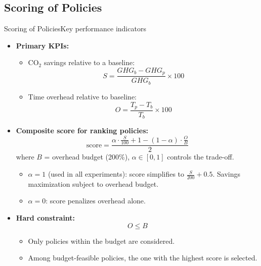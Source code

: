 \subsection{Scoring of Policies}

\begin{frame}[t]{Scoring of Policies}{Key performance indicators}

  \begin{itemize}
    \item \textbf{Primary KPIs:}
      \begin{itemize}
        \item CO$_2$ savings relative to a baseline:
          \[
            S
            = \frac{GHG_{b} -
            GHG_{p}}{GHG_{b}} \times 100
          \]
        \item Time overhead relative to baseline:
          \[
            O
            = \frac{T_{p} -
            T_{b}}{T_{b}} \times 100
          \]
      \end{itemize}

      \vspace{0.2cm}
      \item \textbf{Composite score for ranking policies:}
      \[
        \text{score} = \frac{
          \alpha \cdot \frac{S}{100}
          + 1 - (1-\alpha) \cdot \frac{O}{B}
        }{2}
      \]
      where $B$ = overhead budget (200\%), $\alpha \in [0,1]$ controls
      the trade-off.
      \begin{itemize}
        \item $\alpha = 1$ (used in all experiments): score simplifies to
          $\frac{S}{200} + 0.5$.
          Savings maximization subject to overhead budget.
        \item $\alpha = 0$: score penalizes overhead alone.
      \end{itemize}

      \vspace{0.2cm}
      \item \textbf{Hard constraint:}
      \[
        O \leq B
      \]
      \begin{itemize}
        \item Only policies within the budget are considered.
        \item Among budget-feasible policies, the one with the
          highest score is selected.
      \end{itemize}
  \end{itemize}

\end{frame}
